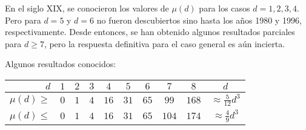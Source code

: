 \documentclass[sans]{amsart}
\newlength{\galIntroHeight}
\newlength{\galIntroWidth}
\newenvironment{surferGalIntroPage}{%
  \newpage
  \special{papersize=\galIntroHeight,\galIntroWidth}
  \pagecolor{textHgColor}
  \color{textFgColor}
  \thispagestyle{empty}
  \begin{flushleft}}%
  {\end{flushleft}}
\newenvironment{surferText}{}{}
\begin{document}
\begin{surferGalIntroPage}
\begin{surferText}
    En el siglo XIX, se conocieron los valores de $\mu(d)$ para los casos $d=1,2,3,4$. Pero para $d=5$ 
    y $d=6$ no fueron descubiertos sino hasta los años 1980 y 1996, respectivamente.
    Desde entonces, se han obtenido algunos resultados parciales para $d\ge 7$, pero la
    respuesta definitiva para el caso general es aún incierta.
  
    Algunos resultados conocidos:
    
   \begin{center}
      \begin{tabular}{r|cccccccc|c}
        $d$ & $1$ & $2$ & $3$ & $4$ & $5$ & $6$ & $7$ & $8$ & $d$\\
        \hline
        \hline
        \rule{0pt}{1.2em}$\mu(d)\ge$ & $0$ & $1$ & $4$ & $16$ & $31$ & $65$ &
        $99$ & $168$ & 
        $\approx \frac{5}{12}d^3$\\[0.3em]
        \hline
        \rule{0pt}{1.2em}$\mu(d)\le$ & $0$ & $1$ & $4$ & $16$ & $31$ & $65$ &
        $104$ & $174$ & $\approx \frac{4}{9}d^3$
      \end{tabular}
    \end{center}
\end{surferText}
  \end{surferGalIntroPage}
%
%
%
\end{document}

